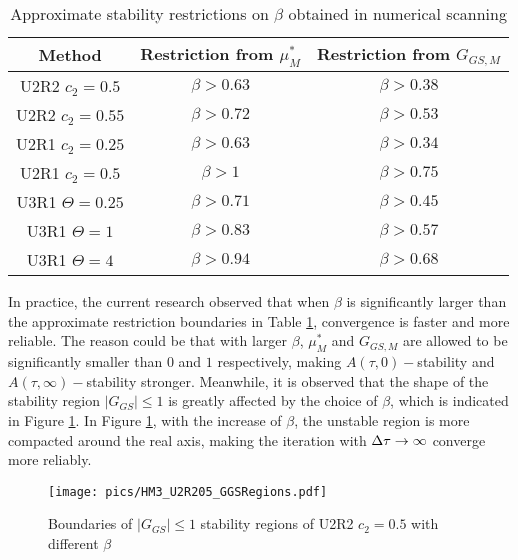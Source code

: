 \begin{table}[htbp]
    \centering
    \begin{tabular}{|c|c|c|}
        \hline
        Method             & Restriction from $\mu^*_{M}$ & Restriction from $G_{GS,M}$ \\
        \hline
        U2R2 $c_2=0.5$     & $\beta > 0.63$               & $\beta > 0.38$              \\
        \hline
        U2R2 $c_2=0.55$    & $\beta > 0.72$               & $\beta > 0.53$              \\
        \hline
        U2R1 $c_2=0.25$    & $\beta > 0.63$               & $\beta > 0.34$              \\
        \hline
        U2R1 $c_2=0.5$     & $\beta > 1$                  & $\beta > 0.75$              \\
        \hline
        U3R1 $\Theta=0.25$ & $\beta > 0.71$               & $\beta > 0.45$              \\
        \hline
        U3R1 $\Theta=1$    & $\beta > 0.83$               & $\beta > 0.57$              \\
        \hline
        U3R1 $\Theta=4$    & $\beta > 0.94$               & $\beta > 0.68$              \\
        \hline
    \end{tabular}
    \caption{Approximate stability restrictions on $\beta$ obtained in numerical scanning}
    \label{tab:resrictionBetaSearch}
\end{table}

In practice, the current research observed that
when $\beta$ is significantly larger than the approximate
restriction boundaries in Table \ref{tab:resrictionBetaSearch},
convergence is faster and more reliable.
The reason could be that with larger $\beta$, $\mu^*_M$  and $G_{GS,M}$
are allowed to be significantly smaller than $0$ and $1$ respectively,
making $A(\tau,0)-$stability and
$A(\tau,\infty)-$stability stronger.
Meanwhile, it is observed that the shape of the stability region
$|G_{GS}|\leq1$ is greatly affected by the choice of $\beta$,
which is indicated in Figure \ref{fig:HM3_U2R205_GGSRegions}.
In Figure \ref{fig:HM3_U2R205_GGSRegions}, with the
increase of $\beta$, the unstable region is more
compacted around the real axis, making the iteration with ${\Delta}\tau\rightarrow\infty$
converge more reliably.
\begin{figure}[htbp]
    \centering
    \texttt{[image: pics/HM3\_U2R205\_GGSRegions.pdf]}
    \caption[]{Boundaries of $|G_{GS}|\leq1$ stability regions of U2R2 $c_2=0.5$ with different $\beta$}
    \label{fig:HM3_U2R205_GGSRegions}
\end{figure}

